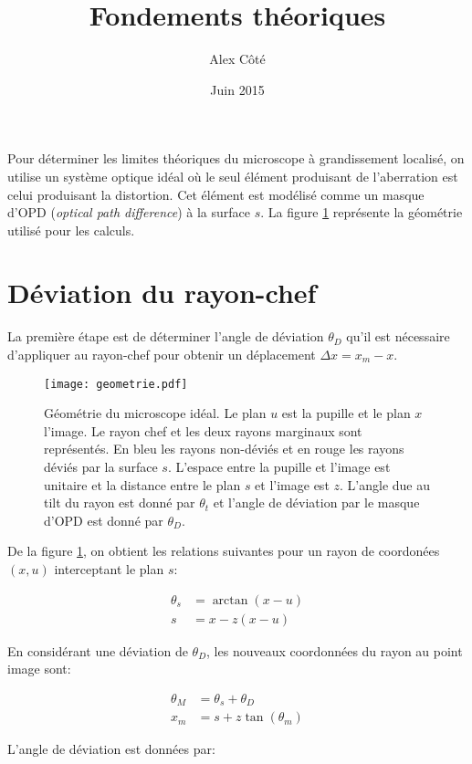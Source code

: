 \documentclass[a4paper,10pt]{article}
\title{Fondements théoriques}
\date{Juin 2015}
\author{Alex Côté}
\numberwithin{equation}{section}
\numberwithin{figure}{section}
\numberwithin{table}{section}
\begin{document}
\maketitle

Pour déterminer les limites théoriques du microscope à grandissement localisé, on utilise un système optique idéal où le seul élément produisant de l'aberration est celui produisant la distortion. Cet élément est modélisé comme un masque d'OPD (\emph{optical path difference}) à la surface $s$. La figure \ref{fig:geometrie} représente la géométrie utilisé pour les calculs.

\section{Déviation du rayon-chef}

La première étape est de déterminer l'angle de déviation $\theta_D$ qu'il est nécessaire d'appliquer au rayon-chef pour obtenir un déplacement $\Delta x = x_m - x$.

\begin{figure}[ht]
	\centering
	\texttt{[image: geometrie.pdf]}
	\caption{Géométrie du microscope idéal. Le plan $u$ est la pupille et le plan $x$ l'image. Le rayon chef et les deux rayons marginaux sont représentés. En bleu les rayons non-déviés et en rouge les rayons déviés par la surface $s$. L'espace entre la pupille et l'image est unitaire et la distance entre le plan $s$ et l'image est $z$. L'angle due au tilt du rayon est donné par $\theta_t$ et l'angle de déviation par le masque d'OPD est donné par $\theta_D$.}
	\label{fig:geometrie}
\end{figure}

De la figure \ref{fig:geometrie}, on obtient les relations suivantes pour un rayon de coordonées $(x,u)$ interceptant le plan $s$:

\begin{align}
	\theta_s &= \arctan (x-u) \\
	s &= x - z(x-u) 	
\end{align}

En considérant une déviation de $\theta_D$, les nouveaux coordonnées du rayon au point image sont:


\begin{align}
	\theta_M &= \theta_s + \theta_D \\
	x_m &= s + z\tan (\theta_m)
\end{align}

L'angle de déviation est données par:
\end{document}
